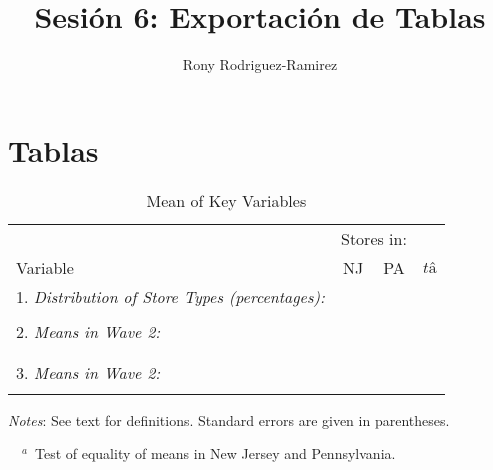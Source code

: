 \documentclass{article}
\begin{document}
\title{Sesión 6: Exportación de Tablas} 
\author{Rony Rodriguez-Ramirez}
\maketitle
\newpage 
\section{Tablas}
\setcounter{table}{1} 

\begin{table}[H]
	\centering
	\label{tab:Table}
		\begin{threeparttable}
			\caption{Mean of Key Variables}
			\begin{tabular}{@{}l*{3}{c}@{}}
                \toprule
				& \multicolumn{2}{c}{Stores in:} & 								\\ \cmidrule(lr){2-3}
				Variable & NJ & PA & $tâ$										\\
				\midrule
				1. \textit{Distribution of Store Types (percentages):} 	& & & 	\\
																		
																		& & & 	\\		
				2. \textit{Means in Wave 2:}							& & & 	\\			
																		& & & 	\\	
								
																		& & &	\\														
				3. \textit{Means in Wave 2:}							& & & 	\\
																		& & & 	\\			
				                		
				\bottomrule
			\end{tabular}
			\begin{tablenotes}
				\setlength{}
				\footnotesize
				\item \textit{Notes}: See text for definitions. Standard errors are given in parentheses.
				\item ~~$^a$~Test of equality of means in New Jersey and Pennsylvania.
			\end{tablenotes}
		\end{threeparttable}
\end{table}
\setcounter{table}{3} 
\end{document}
